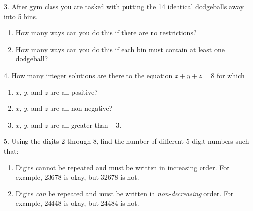 \documentclass[10pt,]{book}
\theoremstyle{plain}
\theoremstyle{definition}
\numberwithin{equation}{chapter}
\begin{document}
\begin{exerciselist}
\par\smallskip
\item[3.]\hypertarget{exercise-97}{}
                After gym class you are tasked with putting the 14 identical dodgeballs away into 5 bins.
            \leavevmode%
\begin{enumerate}[label=(\alph*)]
\item\hypertarget{li-327}{}
                        How many ways can you do this if there are no restrictions?
\item\hypertarget{li-328}{}
                        How many ways can you do this if each bin must contain at least one dodgeball?
\end{enumerate}

\par\smallskip
\item[4.]\hypertarget{exercise-98}{}
                How many integer solutions are there to the equation
                \(x + y + z = 8\)
                for which
            \leavevmode%
\begin{enumerate}[label=(\alph*)]
\item\hypertarget{li-331}{}\(x\),
                    \(y\), and
                    \(z\)
                    are all positive?%
\item\hypertarget{li-332}{}\(x\),
                    \(y\), and
                    \(z\)
                    are all non-negative?%
\item\hypertarget{li-333}{}\(x\),
                    \(y\), and
                    \(z\)
                    are all greater than
                    \(-3\).%
\end{enumerate}

\par\smallskip
\item[5.]\hypertarget{exercise-99}{}
                Using the digits 2 through 8, find the number of different 5-digit numbers such that:
            \leavevmode%
\begin{enumerate}[label=(\alph*)]
\item\hypertarget{li-337}{}
                        Digits cannot be repeated and must be written in increasing order. For example, 23678 is okay, but 32678 is not.
\item\hypertarget{li-338}{}
                        Digits
                        \emph{can}
                        be repeated and must be written in
                        \emph{non-decreasing}
                        order. For example, 24448 is okay, but 24484 is not.
\end{enumerate}


\end{exerciselist}
\end{document}
